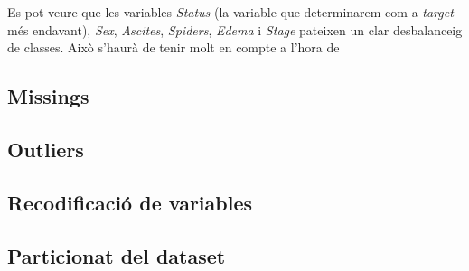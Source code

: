 Es pot veure que les variables \textit{Status} (la variable que determinarem com a \textit{target} més endavant), \textit{Sex}, \textit{Ascites}, \textit{Spiders}, \textit{Edema} i \textit{Stage} pateixen un clar desbalanceig de classes. Això s'haurà de tenir molt en compte a l'hora de 

\subsection{Missings}

\subsection{Outliers}

\subsection{Recodificació de variables}

\subsection{Particionat del dataset}
